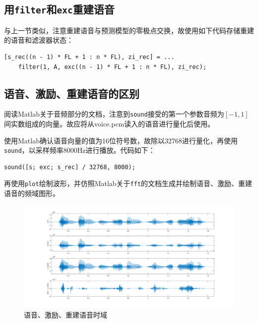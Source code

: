 \documentclass[10pt, a4paper]{article}
\begin{document}
\subsection{用\texttt{filter}和\texttt{exc}重建语音}

与上一节类似，注意重建语音与预测模型的零极点交换，故使用如下代码存储重建的语音和滤波器状态：

\begin{verbatim}
[s_rec((n - 1) * FL + 1 : n * FL), zi_rec] = ...
    filter(1, A, exc((n - 1) * FL + 1 : n * FL), zi_rec);
\end{verbatim}

\subsection{语音、激励、重建语音的区别}

阅读Matlab关于音频部分的文档，注意到\texttt{sound}接受的第一个参数音频为$[-1, 1]$间实数组成的向量。故应将从voice.pcm读入的语音进行量化后使用。

使用Matlab确认语音向量的值为16位符号数，故除以32768进行量化，再使用\texttt{sound}，以采样频率8000Hz进行播放。代码如下：

\begin{verbatim}
sound([s; exc; s_rec] / 32768, 8000);
\end{verbatim}

再使用\texttt{plot}绘制波形，并仿照Matlab关于\texttt{fft}的文档生成并绘制语音、激励、重建语音的频域图形。

\begin{figure}[h]
    \centering
    \includegraphics[width=.95\textwidth]{../assets/1_6_time.png}
    \caption{语音、激励、重建语音时域}
    \label{fig:1_6_time}
\end{figure}
\end{document}
